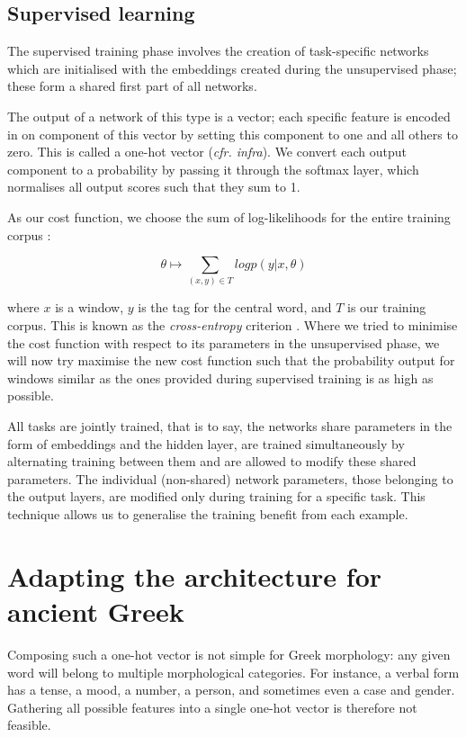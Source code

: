 \subsection{Supervised learning}
\label{sec:supervised}

The supervised training phase involves the creation of task-specific
networks which are initialised with the embeddings created during the
unsupervised phase; these form a shared first part of all networks.


The output of a network of this type is a vector; each specific
feature is encoded in on component of this vector by setting this
component to one and all others to zero. This is called a one-hot
vector (\textit{cfr. infra}). We convert each output component to a
probability by passing it through the softmax layer, which normalises
all output scores such that they sum to 1.

As our cost function, we choose the sum of log-likelihoods for the
entire training corpus \citep[2505--6]{collobert-2011}:

\begin{equation}
  \theta \mapsto \sum\limits_{(x,y) \in T} log p(y|x,\theta)
\end{equation}

where $x$ is a window, $y$ is the tag for the central word, and $T$ is
our training corpus. This is known as the \textit{cross-entropy}
criterion \citep{rubinstein2004cross}. Where we tried to minimise the
cost function with respect to its parameters in the unsupervised
phase, we will now try maximise the new cost function such that the
probability output for windows similar as the ones provided during
supervised training is as high as possible.

All tasks are jointly trained, that is to say, the networks share
parameters in the form of embeddings and the hidden layer, are trained
simultaneously by alternating training between them and are allowed to
modify these shared parameters. The individual (non-shared) network
parameters, those belonging to the output layers, are modified only
during training for a specific task. This technique allows us to
generalise the training benefit from each example.

\section{Adapting the architecture for ancient Greek}
\label{sec:adaptation}

Composing such a one-hot vector is not simple for Greek morphology:
any given word will belong to multiple morphological categories. For
instance, a verbal form has a tense, a mood, a number, a person, and
sometimes even a case and gender. Gathering all possible features into a
single one-hot vector is therefore not feasible.

